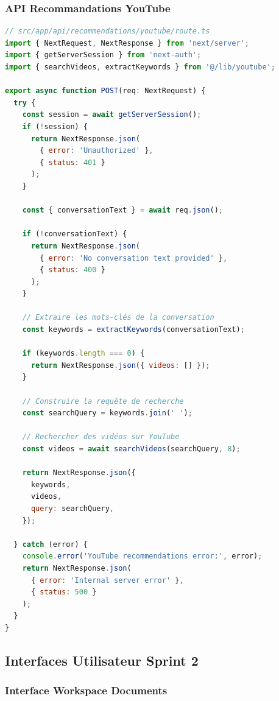 \subsubsection{API Recommandations YouTube}

\begin{lstlisting}[language=JavaScript, caption=API Route pour recommandations YouTube, label=code:api-youtube]
// src/app/api/recommendations/youtube/route.ts
import { NextRequest, NextResponse } from 'next/server';
import { getServerSession } from 'next-auth';
import { searchVideos, extractKeywords } from '@/lib/youtube';

export async function POST(req: NextRequest) {
  try {
    const session = await getServerSession();
    if (!session) {
      return NextResponse.json(
        { error: 'Unauthorized' },
        { status: 401 }
      );
    }

    const { conversationText } = await req.json();

    if (!conversationText) {
      return NextResponse.json(
        { error: 'No conversation text provided' },
        { status: 400 }
      );
    }

    // Extraire les mots-clés de la conversation
    const keywords = extractKeywords(conversationText);

    if (keywords.length === 0) {
      return NextResponse.json({ videos: [] });
    }

    // Construire la requête de recherche
    const searchQuery = keywords.join(' ');

    // Rechercher des vidéos sur YouTube
    const videos = await searchVideos(searchQuery, 8);

    return NextResponse.json({
      keywords,
      videos,
      query: searchQuery,
    });

  } catch (error) {
    console.error('YouTube recommendations error:', error);
    return NextResponse.json(
      { error: 'Internal server error' },
      { status: 500 }
    );
  }
}
\end{lstlisting}

\subsection{Interfaces Utilisateur Sprint 2}

\subsubsection{Interface Workspace Documents}

